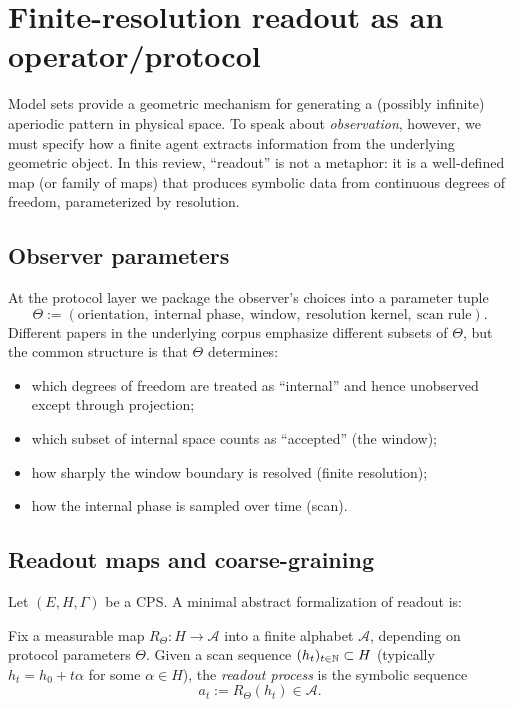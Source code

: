 \section{Finite-resolution readout as an operator/protocol}\label{sec:readout}

Model sets provide a geometric mechanism for generating a (possibly infinite) aperiodic pattern in physical space. To speak about \emph{observation}, however, we must specify how a finite agent extracts information from the underlying geometric object. In this review, ``readout'' is not a metaphor: it is a well-defined map (or family of maps) that produces symbolic data from continuous degrees of freedom, parameterized by resolution.

\subsection{Observer parameters}\label{sec:readout:params}

At the protocol layer we package the observer's choices into a parameter tuple
\[
\Theta := (\text{orientation},\ \text{internal phase},\ \text{window},\ \text{resolution kernel},\ \text{scan rule}).
\]
Different papers in the underlying corpus emphasize different subsets of $\Theta$, but the common structure is that $\Theta$ determines:
\begin{itemize}[leftmargin=*,itemsep=2pt]
  \item which degrees of freedom are treated as ``internal'' and hence unobserved except through projection;
  \item which subset of internal space counts as ``accepted'' (the window);
  \item how sharply the window boundary is resolved (finite resolution);
  \item how the internal phase is sampled over time (scan).
\end{itemize}

\subsection{Readout maps and coarse-graining}\label{sec:readout:maps}

Let $(E,H,\Gamma)$ be a CPS. A minimal abstract formalization of readout is:

\begin{definition}\label{def:readout}
Fix a measurable map $R_\Theta : H \to \mathcal{A}$ into a finite alphabet $\mathcal{A}$, depending on protocol parameters $\Theta$. Given a scan sequence $(h_t)_{t\in \mathbb{N}}\subset H$ (typically $h_t = h_0 + t\alpha$ for some $\alpha\in H$), the \emph{readout process} is the symbolic sequence
\[
a_t := R_\Theta(h_t)\in \mathcal{A}.
\]
\end{definition}

